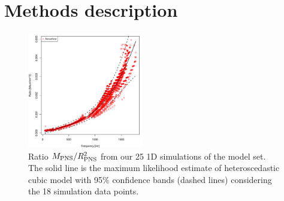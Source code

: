 \section{Methods description}
\label{methods}

\begin{figure}[t]
 \centering
 \includegraphics[width=0.45\textwidth]{plots/model}
 \caption{Ratio $M_{\rm PNS}/R_{\rm PNS}^2$ from our 25 1D simulations of the model set. The solid line is the maximum likelihood estimate of heteroscedastic cubic model with 95\% confidence bands (dashed lines) considering the 18 simulation data points.   } 
 \label{fig:LMVAR}
\end{figure}

